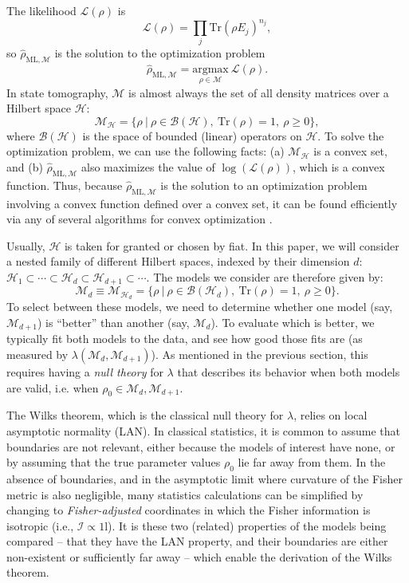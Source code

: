 \documentclass[aps,pra, twocolumn]{revtex4-1}
\newcommand{\M}{\mathcal{M}}
\newcommand{\cH}{\mathcal{H}}
\newcommand{\cL}{\mathcal{L}}
\newcommand{\Id}{\mathbb{I}}
\def\Id{1\!\mathrm{l}}
\newcommand{\rhohat}{\hat{\rho}}
\newcommand{\rhoML}[1]{\rhohat_{\scriptscriptstyle{\mathrm{ML},#1}}}
\begin{document}
The likelihood $\mathcal{L}(\rho)$ is
\begin{equation}
\mathcal{L}(\rho) = \prod_{j}\mathrm{Tr}(\rho E_{j})^{n_{j}},
\end{equation}
so $\rhoML{\M}$ is the solution to the optimization problem
\begin{equation}
\label{eq:mle}
\rhoML{\M} = \underset{\rho \in \M}{\text{argmax}}~\mathcal{L}(\rho).
\end{equation}
In state tomography, $\M$ is almost always the set of all density matrices over a Hilbert space $\cH$:
\begin{equation}
\mathcal{M}_{\cH} = \{\rho~|~\rho \in \mathcal{B}(\mathcal{H}),~\mathrm{Tr}(\rho) =1,~\rho \geq 0\},
\end{equation}
where $\mathcal{B}(\cH)$ is the space of bounded (linear) operators on $\cH$.  To solve the optimization problem, we can use the following facts: (a) $\M_{\cH}$ is a convex set, and (b) $\rhoML{\M}$ also maximizes the value of $\log(\cL(\rho))$, which is a convex function. Thus, because $\rhoML{\M}$ is the solution to an optimization problem involving a convex function defined over a convex set, it can be found efficiently via any of several algorithms for convex optimization \cite{Boyd}.

Usually, $\cH$ is taken for granted or chosen by fiat.  In this paper, we will consider a nested family of different Hilbert spaces, indexed by their dimension $d$: $\cH_{1}  \subset \cdots \subset \cH_{d} \subset \cH_{d+1} \subset \cdots$.  The models we consider are therefore given by:
\begin{equation}
\label{eq:modelsd}
\M_{d} \equiv \mathcal{M}_{\cH_{d}} = \{\rho~|~\rho \in \mathcal{B}(\mathcal{H}_{d}),~\mathrm{Tr}(\rho) =1,~\rho \geq 0\}.
\end{equation}
To select between these models, we need to determine whether one model (say, $\M_{d + 1}$) is ``better'' than another (say, $\M_{d}$).  To evaluate which is better, we typically fit both models to the data, and see how good those fits are (as measured by $\lambda(\M_{d}, \M_{d+1})$). As mentioned in the previous section, this requires having a \emph{null theory} for $\lambda$ that describes its behavior when both models are valid, i.e. when $\rho_{0} \in \M_{d},\M_{d + 1}$.

The Wilks theorem, which is the classical null theory for $\lambda$, relies on local asymptotic normality (LAN). In classical statistics, it is common to assume that boundaries are not relevant, either because the models of interest have none, or by assuming that the true parameter values $\rho_{0}$ lie far away from them.  In the absence of boundaries, and in the asymptotic limit where curvature of the Fisher metric is also negligible, many statistics calculations can be simplified by changing to \emph{Fisher-adjusted} coordinates in which the Fisher information is isotropic (i.e., $\mathcal{I}\propto\Id$). It is these two (related) properties of the models being compared -- that they have the LAN property, and their boundaries are either non-existent or sufficiently far away -- which enable the derivation of the Wilks theorem.
\end{document}

